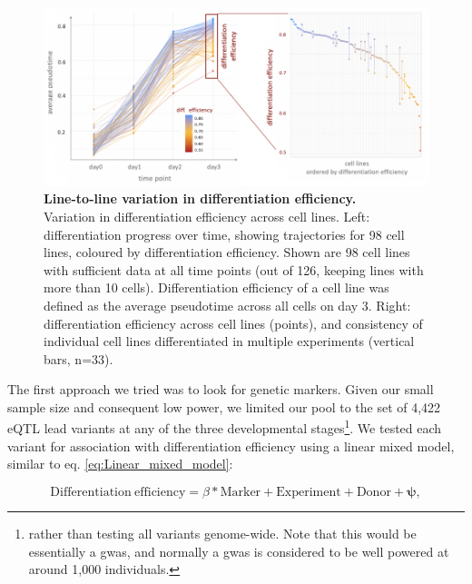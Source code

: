 \begin{figure}[h]
\centering
\includegraphics[width=15.5cm]{Chapter4/Fig/endodiff_differentiation_efficiency.png}
\caption[Line-to-line variation in differentiation efficiency]{\textbf{Line-to-line variation in differentiation efficiency.}\\
Variation in differentiation efficiency across cell lines. 
Left: differentiation progress over time, showing trajectories for 98 cell lines, coloured by differentiation efficiency. 
Shown are 98 cell lines with sufficient data at all time points (out of 126, keeping lines with more than 10 cells). 
Differentiation efficiency of a cell line was defined as the average pseudotime across all cells on day 3.
Right: differentiation efficiency across cell lines (points), and consistency of individual cell lines differentiated in multiple experiments (vertical bars, n=33).}
\label{fig:endodiff_differentiation_efficiency}
\end{figure}

The first approach we tried was to look for genetic markers.
Given our small sample size and consequent low power, we limited our pool to the set of 4,422 eQTL lead variants at any of the three developmental stages\footnote{rather than testing all variants genome-wide. Note that this would be essentially a \gls{gwas}, and normally a \gls{gwas} is considered to be well powered at around 1,000 individuals.}.
We tested each variant for association with differentiation efficiency using a linear mixed model, similar to eq. \eqref{eq:Linear_mixed_model}:

\begin{equation}\label{eq:LMM_differentiation_efficiency_prediction}
    \mathrm{Differentiation} \ \mathrm{efficiency} = \beta*\mathrm{Marker} + \mathrm{Experiment} + \mathrm{Donor} + \boldsymbol{\psi},
\end{equation}

